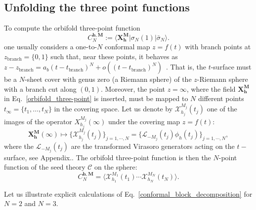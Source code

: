 \documentclass[a4paper,11pt]{article}
\begin{document}
\subsection{Unfolding the three point functions}

To compute the orbifold three-point function
\begin{equation}\label{orbifold_three-point}
 C_N^{\boldsymbol{h},\boldsymbol{M}}:=\langle \boldsymbol{X}_{\boldsymbol{h}}^{\boldsymbol{M}}| \sigma_N(1)|\bar{\sigma}_N\rangle.
\end{equation}
one usually considers a one-to-$N$ conformal map
$z=f(t)$ with branch points at $z_{\text{branch}}=\{0, 1\}$ such that, near 
these points, it behaves as $z-z_{\text{branch}}=a_b(t-t_{\text{branch}})^N+o((t-t_{\text{branch}})^N)$~\cite{Lunin}.
That is, the $t$-surface must be a $N$-sheet cover with genus zero (a Riemann sphere)
 of the $z$-Riemann sphere with a branch cut along 
$(0,1)$. Moreover, the point $z=\infty$, where the field $\boldsymbol{X}_{\boldsymbol{h}}^{\boldsymbol{M}}$ in Eq.~\eqref{orbifold_three-point} is inserted,
must be mapped to $N$ different points $t_\infty=\{t_1, \dots, t_N\}$ in 
the covering space. Let us denote by $\mathcal{X}_{h_j}^{M_j}(t_j)$ one of the images
of the operator $X_{h_j}^{M_j}(\infty)$ under the covering map $z=f(t)$:
\begin{equation}
\boldsymbol{X}_{\boldsymbol{h}}^{\boldsymbol{M}}(\infty)\mapsto \{\mathcal{X}_{h_j}^{M_j}(t_j)\}_{j=1,\cdots,N}= \{\boldsymbol{\mathcal{L}}_{-M_j}(t_j)\phi_{h}(t_j)\}_{j=1,\cdots,N},
\end{equation}
where the $\boldsymbol{\mathcal{L}}_{-M_j}(t_j)$ are the transformed Virasoro generators acting on the $t-$ surface, see Appendix..
 The  orbifold  three-point 
function  is then the $N$-point function of the seed theory $\mathcal{C}$ on the sphere:
\begin{equation}\label{N-point}
 C_N^{\boldsymbol{h},\boldsymbol{M}}=\langle \mathcal{X}^{M_1}_{h_1}(t_1)\cdots\mathcal{X}_{h_N}^{M_N}(t_N)\rangle.
\end{equation}

\noindent Let us illustrate explicit calculations of Eq.~\eqref{conformal_block_decomposition} for $N=2$ and $N=3$. 
\end{document}
